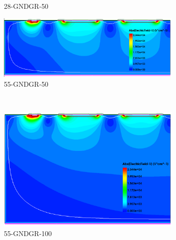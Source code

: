 \begin{figure}[htbp]
\begin{subfigure}[b]{0.5\textwidth}
    \caption{28-GNDGR-50}
  \end{subfigure}\hfill
  \begin{subfigure}[b]{0.5\textwidth}
    \includegraphics[width=\textwidth]{figures/ActiveEdge/Efield_55_GNDGR.png}
    \caption{55-GNDGR-50}
  \end{subfigure} \\
  \begin{subfigure}[b]{0.5\textwidth}
    \includegraphics[width=\textwidth]{figures/ActiveEdge/Efield_55_GNDGR_100.png}
    \caption{55-GNDGR-100}
  \end{subfigure}\hfill
  \begin{subfigure}[b]{0.5\textwidth}

\end{subfigure}
\end{figure}
